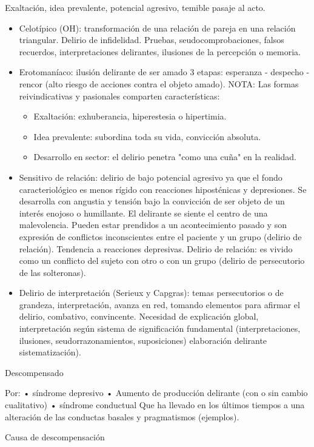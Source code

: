 Exaltación, idea prevalente, potencial agresivo, temible pasaje al acto.
\begin{itemize}
	\item Celotípico (OH): transformación de una relación de pareja en una relación triangular. Delirio de infidelidad. Pruebas, seudocomprobaciones, falsos recuerdos, interpretaciones delirantes, ilusiones de la percepción o memoria.
	\item Erotomaníaco: ilusión delirante de ser amado 3 etapas: esperanza - despecho - rencor (alto riesgo de acciones contra el objeto amado). NOTA: Las formas reivindicativas y pasionales comparten características:
	\begin{itemize}
		\item Exaltación: exhuberancia, hiperestesia o hipertimia.
		\item Idea prevalente: subordina toda su vida, convicción absoluta.
		\item Desarrollo en sector: el delirio penetra "como una cuña" en la realidad.
	\end{itemize}
	\item  Sensitivo de relación: delirio de bajo potencial agresivo ya que el fondo caracteriológico es menos rígido con reacciones hiposténicas y depresiones. Se desarrolla con angustia y tensión bajo la convicción de ser objeto de un interés enojoso o humillante. El delirante se siente el centro de una malevolencia. Pueden estar prendidos a un acontecimiento pasado y son expresión de conflictos inconscientes entre el paciente y un grupo (delirio de relación). Tendencia a reacciones depresivas. Delirio de relación: es vivido como un conflicto del sujeto con otro o con un grupo (delirio de persecutorio de las solteronas).
	\item Delirio de interpretación (Serieux y Capgras): temas persecutorios o de grandeza, interpretación, avanza en red, tomando elementos para afirmar el delirio, combativo, convincente. Necesidad de explicación global, interpretación según sistema de significación fundamental (interpretaciones, ilusiones, seudorrazonamientos, suposiciones) elaboración delirante sistematización).
\end{itemize}
Descompensado

Por: • síndrome depresivo • Aumento de producción delirante (con o sin cambio cualitativo) • síndrome conductual Que ha llevado en los últimos tiempos a una alteración de las conductas basales y pragmatismos (ejemplos).

Causa de descompensación

